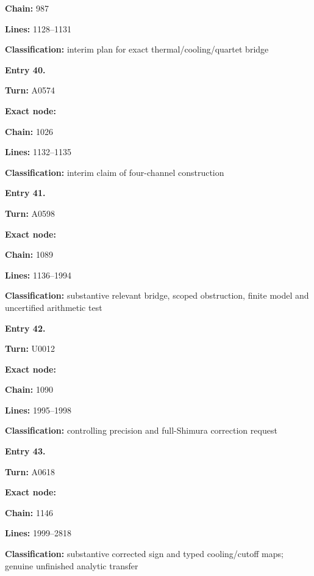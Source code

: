 \textbf{Chain:} 987

\textbf{Lines:} 1128--1131

\textbf{Classification:} interim plan for exact thermal/cooling/quartet
bridge


\textbf{Entry 40.}

\textbf{Turn:} A0574

\textbf{Exact node:} \protect{}

\textbf{Chain:} 1026

\textbf{Lines:} 1132--1135

\textbf{Classification:} interim claim of four-channel construction


\textbf{Entry 41.}

\textbf{Turn:} A0598

\textbf{Exact node:} \protect{}

\textbf{Chain:} 1089

\textbf{Lines:} 1136--1994

\textbf{Classification:} substantive relevant bridge, scoped
obstruction, finite model and uncertified arithmetic test


\textbf{Entry 42.}

\textbf{Turn:} U0012

\textbf{Exact node:} \protect{}

\textbf{Chain:} 1090

\textbf{Lines:} 1995--1998

\textbf{Classification:} controlling precision and full-Shimura
correction request


\textbf{Entry 43.}

\textbf{Turn:} A0618

\textbf{Exact node:} \protect{}

\textbf{Chain:} 1146

\textbf{Lines:} 1999--2818

\textbf{Classification:} substantive corrected sign and typed
cooling/cutoff maps; genuine unfinished analytic transfer


